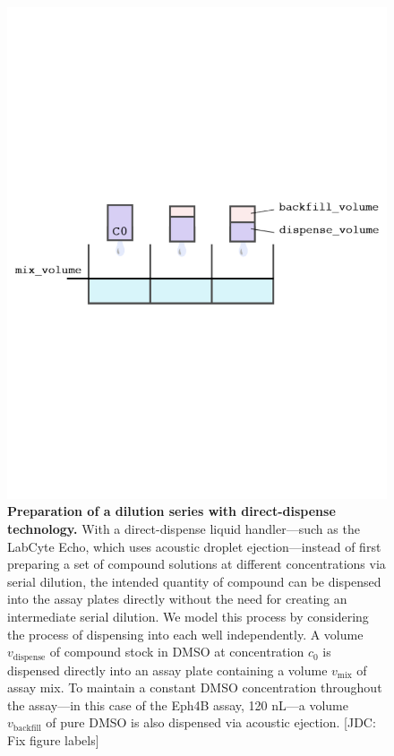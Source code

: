 \documentclass[aps,pre,twocolumn,nofootinbib,superscriptaddress,linenumbers]{revtex4-1}
\begin{document}
\begin{figure}[tb]
    \includegraphics[trim={0 9cm 0 9cm},clip,width=\columnwidth]{../figures/direct_dispense.pdf}

  \caption{{\bf Preparation of a dilution series with direct-dispense technology.}
  With a direct-dispense liquid handler---such as the LabCyte Echo, which uses acoustic droplet ejection---instead of first preparing a set of compound solutions at different concentrations via serial dilution, the intended quantity of compound can be dispensed into the assay plates directly without the need for creating an intermediate serial dilution.
  We model this process by considering the process of dispensing into each well independently.
  A volume $v_\mathrm{dispense}$ of compound stock in DMSO at concentration $c_0$ is dispensed directly into an assay plate containing a volume $v_\mathrm{mix}$ of assay mix.
  To maintain a constant DMSO concentration throughout the assay---in this case of the Eph4B assay, 120 nL---a volume $v_\mathrm{backfill}$ of pure DMSO is also dispensed via acoustic ejection.
  {\color{red}[JDC: Fix figure labels]}
  }
  \label{fig:direct_dispense}
\end{figure}
\end{document}
